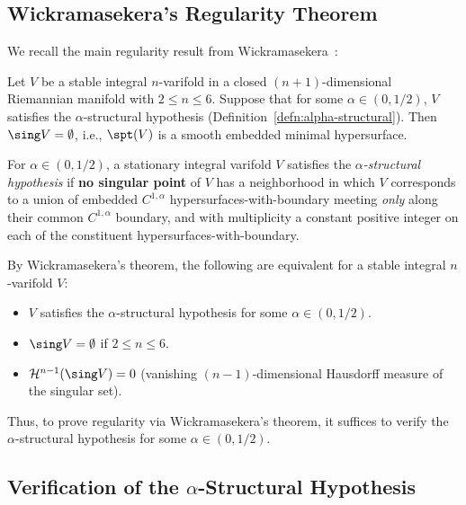 \subsection{Wickramasekera's Regularity Theorem}

We recall the main regularity result from Wickramasekera~\cite{Wic14}:

\begin{theorem}\label{thm:wickramasekera}
    Let $V$ be a stable integral $n$-varifold in a closed $(n+1)$-dimensional Riemannian manifold
    with $2\leq n\leq 6$. Suppose that for some $\alpha \in (0, 1/2)$, $V$ satisfies the $\alpha$-structural hypothesis (Definition~\ref{defn:alpha-structural}).
    Then $\sing V = \emptyset$, i.e., $\spt(V)$ is a smooth embedded minimal hypersurface.
\end{theorem}

\begin{definition}\label{defn:alpha-structural}
For $\alpha \in (0, 1/2)$, a stationary integral varifold $V$ satisfies the \emph{$\alpha$-structural hypothesis} if \textbf{no singular point}
of $V$ has a neighborhood in which $V$ corresponds to a union of embedded $C^{1,\alpha}$ hypersurfaces-with-boundary
meeting \emph{only} along their common $C^{1,\alpha}$ boundary, and with multiplicity a constant positive integer
on each of the constituent hypersurfaces-with-boundary.
\end{definition}

\begin{remark}
By Wickramasekera's theorem, the following are equivalent for a stable integral $n$-varifold $V$:
\begin{itemize}
    \item[(a)] $V$ satisfies the $\alpha$-structural hypothesis for some $\alpha \in (0, 1/2)$.
    \item[(b)] $\sing V = \emptyset$ if $2 \leq n \leq 6$.
    \item[(c)] $\mathcal{H}^{n-1}(\sing V) = 0$ (vanishing $(n-1)$-dimensional Hausdorff measure of the singular set).
\end{itemize}
Thus, to prove regularity via Wickramasekera's theorem, it suffices to verify the $\alpha$-structural hypothesis for some $\alpha \in (0, 1/2)$.
\end{remark}

\subsection{Verification of the $\alpha$-Structural Hypothesis}\label{sec:alpha-verification}

